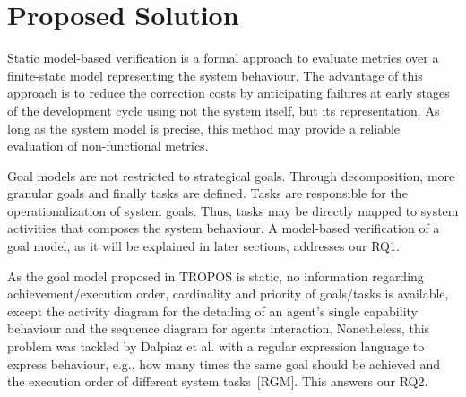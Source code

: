 \noindent{}\bigskip




\section{Proposed Solution}

Static model-based verification is a formal approach to evaluate metrics over a finite-state model representing the system behaviour. The advantage of this approach is to reduce the correction costs by anticipating failures at early stages of the development cycle using not the system itself, but its representation. As long as the system model is precise, this method may provide a reliable evaluation of non-functional metrics. 

Goal models are not restricted to strategical goals. Through decomposition, more granular goals and finally tasks are defined. Tasks are responsible for the operationalization of system goals. Thus, tasks may be directly mapped to system activities that composes the system behaviour. A model-based verification of a goal model, as it will be explained in later sections, addresses our RQ1.


As the goal model proposed in TROPOS is static, no information regarding achievement/execution order, cardinality and priority of goals/tasks is available, except the activity diagram for the detailing of an agent's single capability behaviour and the sequence diagram for agents interaction. Nonetheless, this problem was tackled by Dalpiaz et al. with a regular expression language to express behaviour, e.g., how many times the same goal should be achieved and the execution order of different system tasks~[RGM]. This answers our RQ2. 


